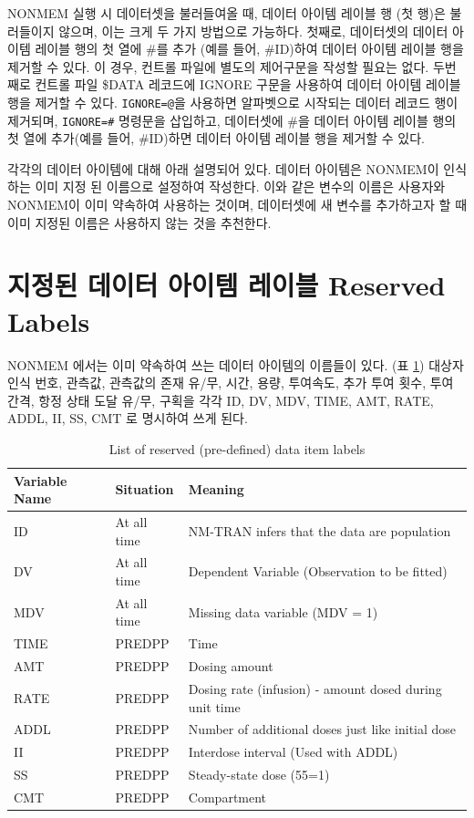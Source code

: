 \documentclass[
  10pt,
  krantz2,
  a4paper]{krantz}
\theoremstyle{definition}
\theoremstyle{definition}
\theoremstyle{definition}
\theoremstyle{remark}
\begin{document}
NONMEM 실행 시 데이터셋을 불러들여올 때, 데이터 아이템 레이블 행 (첫 행)은 불러들이지 않으며, 이는 크게 두 가지 방법으로 가능하다. 첫째로, 데이터셋의 데이터 아이템 레이블 행의 첫 열에 \#를 추가 (예를 들어, \#ID)하여 데이터 아이템 레이블 행을 제거할 수 있다. 이 경우, 컨트롤 파일에 별도의 제어구문을 작성할 필요는 없다. 두번째로 컨트롤 파일 \$DATA 레코드에 IGNORE 구문을 사용하여 데이터 아이템 레이블 행을 제거할 수 있다. \texttt{IGNORE=@}을 사용하면 알파벳으로 시작되는 데이터 레코드 행이 제거되며, \texttt{IGNORE=\#} 명령문을 삽입하고, 데이터셋에 \#을 데이터 아이템 레이블 행의 첫 열에 추가(예를 들어, \#ID)하면 데이터 아이템 레이블 행을 제거할 수 있다.

각각의 데이터 아이템에 대해 아래 설명되어 있다. 데이터 아이템은 NONMEM이 인식하는 이미 지정 된 이름으로 설정하여 작성한다. 이와 같은 변수의 이름은 사용자와 NONMEM이 이미 약속하여 사용하는 것이며, 데이터셋에 새 변수를 추가하고자 할 때 이미 지정된 이름은 사용하지 않는 것을 추천한다.

\hypertarget{uxc9c0uxc815uxb41c-uxb370uxc774uxd130-uxc544uxc774uxd15c-uxb808uxc774uxbe14-reserved-labels}{%
\section{지정된 데이터 아이템 레이블 Reserved Labels}\label{uxc9c0uxc815uxb41c-uxb370uxc774uxd130-uxc544uxc774uxd15c-uxb808uxc774uxbe14-reserved-labels}}

NONMEM 에서는 이미 약속하여 쓰는 데이터 아이템의 이름들이 있다. (표 \ref{tab:reserveditems}) 대상자 인식 번호, 관측값, 관측값의 존재 유/무, 시간, 용량, 투여속도, 추가 투여 횟수, 투여 간격, 항정 상태 도달 유/무, 구획을 각각 ID, DV, MDV, TIME, AMT, RATE, ADDL, II, SS, CMT 로 명시하여 쓰게 된다.

\begin{table}

\caption{\label{tab:reserveditems}List of reserved (pre-defined) data item labels}
\centering
\begin{tabular}[t]{lll}
\toprule
Variable Name & Situation & Meaning\\
\midrule
ID & At all time & NM-TRAN infers that the data are population\\
DV & At all time & Dependent Variable (Observation to be fitted)\\
MDV & At all time & Missing data variable (MDV = 1)\\
TIME & PREDPP & Time\\
AMT & PREDPP & Dosing amount\\
\addlinespace
RATE & PREDPP & Dosing rate (infusion) - amount dosed during unit time\\
ADDL & PREDPP & Number of additional doses just like initial dose\\
II & PREDPP & Interdose interval (Used with ADDL)\\
SS & PREDPP & Steady-state dose (55=1)\\
CMT & PREDPP & Compartment\\
\bottomrule
\end{tabular}
\end{table}
\end{document}
